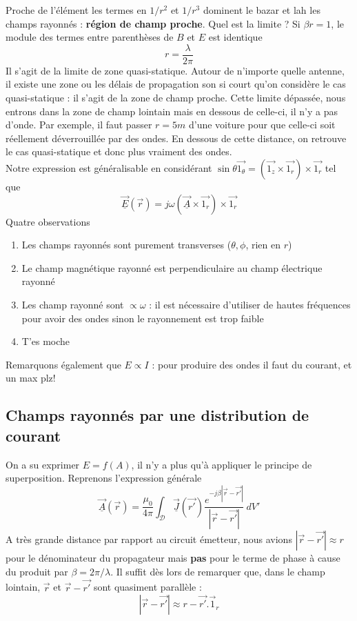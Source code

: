 	Proche de l'élément les termes en $1/r^2$ et $1/r^3$ dominent le bazar et lah les champs 
	rayonnés : \textbf{région de champ proche}. Quel est la limite ? Si $\beta r= 1$, le 
	module des termes entre parenthèses de $B$ et $E$ est identique 
	\begin{equation}
	r = \dfrac{\lambda}{2\pi}
	\end{equation}
	Il s'agit de la limite de zone quasi-statique. Autour de n'importe quelle antenne, il 
	existe une zone ou les délais de propagation son si court qu'on considère le cas 
	quasi-statique : il s'agit de la zone de champ proche. Cette limite dépassée, nous 
	entrons dans la zone de champ lointain mais en dessous de celle-ci, il n'y a pas d'onde.
	Par exemple, il faut passer $r=5m$ d'une voiture pour que celle-ci soit réellement 
	déverrouillée par des ondes. En dessous de cette distance, on retrouve le cas quasi-statique 
	et donc plus vraiment des ondes.\\
	
	Notre expression est généralisable en considérant $
	\sin\theta \vec{1_\theta} = \left(\vec{1_z}\times\vec{1_r}\right)\times\vec{1_r}$ tel que
	\begin{equation}
	\underline{\vec{E}}(\vec{r}) = j\omega\left(\underline{\vec{A}}\times\vec{1_r}\right)\times 
	\vec{1_r}
	\end{equation}
	Quatre observations
	\begin{enumerate}
	\item Les champs rayonnés sont purement transverses ($\theta,\phi$, rien en $r$)
	\item Le champ magnétique rayonné est perpendiculaire au champ électrique rayonné
	\item Les champ rayonné sont $\propto \omega$ : il est nécessaire d'utiliser de hautes 
	fréquences pour avoir des ondes sinon le rayonnement est trop faible
	\item T'es moche
	\end{enumerate}
	Remarquons également que $E\propto I$ : pour produire des ondes il faut du courant, et 
	un max plz!
	
	\subsection{Champs rayonnés par une distribution de courant}
	On a su exprimer $E = f(A)$, il n'y a plus qu'à appliquer le principe de superposition. 
	Reprenons l'expression générale
	\begin{equation}
	\underline{\vec{A}}(\vec{r}) = \dfrac{\mu_0}{4\pi}\int_\mathcal{D}\underline{\vec{J}}(\vec{r'})
	\dfrac{e^{-j\beta|\vec{r}-\vec{r'}|}}{|\vec{r}-\vec{r'}|}\ dV'
	\end{equation}
	A très grande distance par rapport au circuit émetteur, nous avions $|\vec{r}-\vec{r'}|
	\approx r$ pour le dénominateur du propagateur mais \textbf{pas} pour le terme de phase 
	à cause du produit par $\beta = 2\pi/\lambda$. Il suffit dès lors de remarquer que, dans le 
	champ lointain, $\vec{r}$ et $\vec{r}-\vec{r'}$ sont quasiment parallèle :
	\begin{equation}
	|\vec{r}-\vec{r'}| \approx r - \vec{r'}.\vec{1}_r
	\end{equation}


